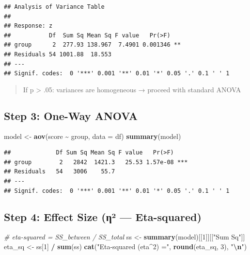 \documentclass[
]{article}
\newenvironment{Shaded}{\begin{snugshade}}{\end{snugshade}}
\newcommand{\AttributeTok}[1]{\textcolor[rgb]{0.13,0.29,0.53}{#1}}
\newcommand{\CommentTok}[1]{\textcolor[rgb]{0.56,0.35,0.01}{\textit{#1}}}
\newcommand{\DecValTok}[1]{\textcolor[rgb]{0.00,0.00,0.81}{#1}}
\newcommand{\FunctionTok}[1]{\textcolor[rgb]{0.13,0.29,0.53}{\textbf{#1}}}
\newcommand{\NormalTok}[1]{#1}
\newcommand{\OtherTok}[1]{\textcolor[rgb]{0.56,0.35,0.01}{#1}}
\newcommand{\SpecialCharTok}[1]{\textcolor[rgb]{0.81,0.36,0.00}{\textbf{#1}}}
\newcommand{\StringTok}[1]{\textcolor[rgb]{0.31,0.60,0.02}{#1}}
\begin{document}
\begin{verbatim}
## Analysis of Variance Table
## 
## Response: z
##           Df  Sum Sq Mean Sq F value   Pr(>F)   
## group      2  277.93 138.967  7.4901 0.001346 **
## Residuals 54 1001.88  18.553                    
## ---
## Signif. codes:  0 '***' 0.001 '**' 0.01 '*' 0.05 '.' 0.1 ' ' 1
\end{verbatim}

\begin{quote}
If p \textgreater{} .05: variances are homogeneous → proceed with
standard ANOVA
\end{quote}

\subsection{Step 3: One-Way ANOVA}\label{step-3-one-way-anova}

\begin{Shaded}
\begin{Highlighting}[]
\NormalTok{model }\OtherTok{\textless{}{-}} \FunctionTok{aov}\NormalTok{(score }\SpecialCharTok{\textasciitilde{}}\NormalTok{ group, }\AttributeTok{data =}\NormalTok{ df)}
\FunctionTok{summary}\NormalTok{(model)}
\end{Highlighting}
\end{Shaded}

\begin{verbatim}
##             Df Sum Sq Mean Sq F value   Pr(>F)    
## group        2   2842  1421.3   25.53 1.57e-08 ***
## Residuals   54   3006    55.7                     
## ---
## Signif. codes:  0 '***' 0.001 '**' 0.01 '*' 0.05 '.' 0.1 ' ' 1
\end{verbatim}

\subsection{Step 4: Effect Size (η² ---
Eta-squared)}\label{step-4-effect-size-ux3b7uxb2-eta-squared}

\begin{Shaded}
\begin{Highlighting}[]
\CommentTok{\# eta{-}squared = SS\_between / SS\_total}
\NormalTok{ss      }\OtherTok{\textless{}{-}} \FunctionTok{summary}\NormalTok{(model)[[}\DecValTok{1}\NormalTok{]][[}\StringTok{"Sum Sq"}\NormalTok{]]}
\NormalTok{eta\_sq  }\OtherTok{\textless{}{-}}\NormalTok{ ss[}\DecValTok{1}\NormalTok{] }\SpecialCharTok{/} \FunctionTok{sum}\NormalTok{(ss)}
\FunctionTok{cat}\NormalTok{(}\StringTok{"Eta{-}squared (eta\^{}2) ="}\NormalTok{, }\FunctionTok{round}\NormalTok{(eta\_sq, }\DecValTok{3}\NormalTok{), }\StringTok{"}\SpecialCharTok{\textbackslash{}n}\StringTok{"}\NormalTok{)}
\end{Highlighting}
\end{Shaded}
\end{document}
